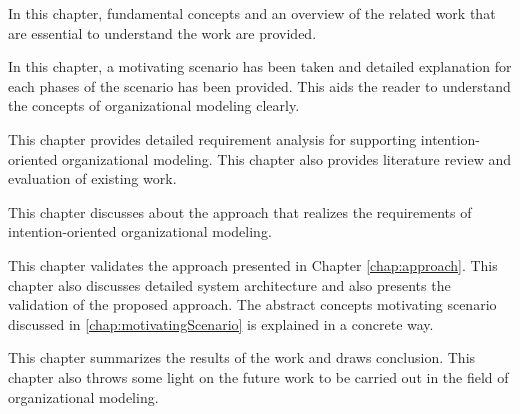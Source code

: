 \begin{description} [labelwidth = 0.07\textwidth]
	\item[Chapter ~\ref{chap:fundamentals} -- \nameref{chap:fundamentals}:] In this chapter, fundamental concepts and an overview of the related work that are essential to understand the work are provided.
	\item[Chapter ~\ref{chap:motivatingScenario} -- \nameref{chap:motivatingScenario}:] In this chapter, a motivating scenario has been taken and detailed explanation for each phases of the scenario has been provided. This aids the reader to understand the concepts of organizational modeling clearly. 
	\item [Chapter ~\ref{chap:analysis} --\textbf{Requirements for Supporting Intention-oriented Organizational Modeling}:] This chapter provides detailed requirement analysis for supporting intention-oriented organizational modeling. This chapter also provides literature review and evaluation of existing work.
	\item[Chapter ~\ref{chap:approach} -- \nameref{chap:approach}:] This chapter discusses about the approach that realizes the requirements  of intention-oriented organizational modeling.
	\item[Chapter ~\ref{chap:casestudy} -- \nameref{chap:casestudy}:] This chapter validates the approach presented in Chapter \ref{chap:approach}. This chapter also discusses detailed system architecture and also presents the validation of the proposed approach. The abstract concepts motivating scenario discussed in \ref{chap:motivatingScenario} is explained in a concrete way.	
	\item[Chapter ~\ref{chap:conclusion} -- \nameref{chap:conclusion}:] This chapter summarizes the results of the work and draws conclusion. This chapter also throws some light on the future work to be carried out in the field of organizational modeling. 
\end{description}